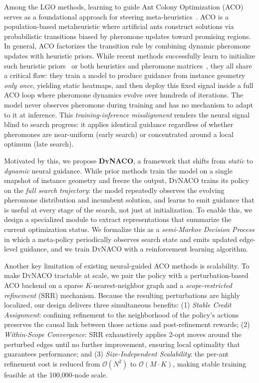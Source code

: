 \documentclass[sigconf]{acmart}
\newcommand{\DyNACO}{\textsc{DyNACO}}
\begin{document}
Among the LGO methods, learning to guide Ant Colony Optimization (ACO)~\cite{ACO, maxmin} serves as a foundational approach for steering meta-heuristics~\cite{deepaco,gtgaco}. ACO is a population-based metaheuristic where artificial ants construct solutions via probabilistic transitions biased by pheromone updates toward promising regions. In general, ACO factorizes the transition rule by combining dynamic pheromone updates with heuristic priors. While recent methods successfully learn to initialize such heuristic priors~\cite{deepaco,gfacs} or both heuristics and pheromone matrices~\cite{gtgaco}, they all share a critical flaw: they train a model to produce guidance from instance geometry \emph{only once}, yielding static heatmaps, and then deploy this fixed signal inside a full ACO loop where pheromone dynamics evolve over hundreds of iterations.
The model never observes pheromone during training and has no mechanism to adapt to it at inference.
This \emph{training-inference misalignment} renders the neural signal blind to search progress: it applies identical guidance regardless of whether pheromones are near-uniform (early search) or concentrated around a local optimum (late search).

Motivated by this, we propose \textbf{\DyNACO{}}, a framework that shifts from \emph{static} to \emph{dynamic} neural guidance. While prior methods train the model on a single snapshot of instance geometry and freeze the output, \DyNACO{} trains its policy on the \emph{full search trajectory}: the model repeatedly observes the evolving pheromone distribution and incumbent solution, and learns to emit guidance that is useful at every stage of the search, not just at initialization. To enable this, we design a specialized module to extract representations that summarize the current optimization status. 
We formalize this as a \emph{semi-Markov Decision Process} in which a meta-policy periodically observes search state and emits updated edge-level guidance, and we train \DyNACO{}  with a reinforcement learning algorithm.

Another key limitation of existing neural-guided ACO methods is scalability. To make \DyNACO{} tractable at scale, we pair the policy with a perturbation-based ACO backend on a sparse $K$-nearest-neighbor graph and a \emph{scope-restricted refinement} (SRR) mechanism. Because the resulting perturbations are highly localized, our design delivers three simultaneous benefits: (1) \emph{Stable Credit Assignment}: confining refinement to the neighborhood of the policy's actions preserves the causal link between those actions and post-refinement rewards; (2) \emph{Within-Scope Convergence}: SRR exhaustively applies 2-opt moves around the perturbed edges until no further improvement, ensuring local optimality that guarantees performance; and (3) \emph{Size-Independent Scalability}: the per-ant refinement cost is reduced from $\mathcal{O}(N^2)$ to $\mathcal{O}(M \cdot K)$, making stable training feasible at the 100,000-node scale.
\end{document}
